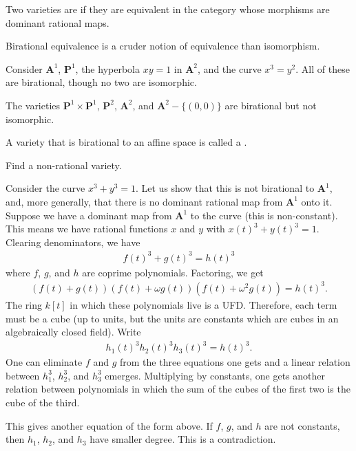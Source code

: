 \documentclass [11 pt, oneside, margin = 1 in] {article}
\begin{document}
\begin{definition}
	Two varieties are  if they are equivalent in the category whose morphisms are dominant rational maps.
\end{definition}

\begin{remark}
	Birational equivalence is a cruder notion of equivalence than isomorphism.
\end{remark}

\begin{example}[ ]\label{}\text{}
Consider $\mathbf{A}^1$, $\mathbf{P}^1 $, the hyperbola $xy=1$ in $\mathbf{A}^2$, and the curve $x^3=y^2$. All of these are birational, though no two are isomorphic.

The varieties $\mathbf{P}^1\times \mathbf{P}^1$, $\mathbf{P}^2$, $\mathbf{A}^2$, and $\mathbf{A}^2-\{(0,0)\}$ are birational but not isomorphic.
\end{example}

\begin{remark}
	A variety that is birational to an affine space is called a .
\end{remark}

\begin{problem}
	Find a non-rational variety.
\end{problem}

\begin{example}[ ]\label{}\text{}
Consider the curve $x^3+y^3=1$. Let us show that this is not birational to $\mathbf{A}^1$, and, more generally, that there is no dominant rational map from $\mathbf{A}^1$ onto it. Suppose we have a dominant map from $\mathbf{A}^1$ to the curve (this is non-constant). This means we have rational functions $x$ and $y$ with $x(t)^3+y (t)^3 =1$. Clearing denominators, we have 
\begin{align*}
	f(t)^3+g (t)^3=h (t)^3
\end{align*}
where $f$, $g$, and $h$ are coprime polynomials. Factoring, we get
\begin{align*}
	(f(t)+g (t)) (f(t)+\omega g (t)) (f(t) + \omega^2g (t)) = h(t)^3.
\end{align*}
The ring $k[t]$ in which these polynomials live is a UFD. Therefore, each term must be a cube (up to units, but the units are constants which are cubes in an algebraically closed field). Write
\begin{align*}
	h_1 (t)^3 h_2(t)^3  h_3(t)^3 = h (t)^3.
\end{align*}
One can eliminate $f$ and $g$ from the three equations one gets and a linear relation between $h_1^3$, $h_2^3$, and $h_3^3$ emerges. Multiplying by constants, one gets another relation between polynomials in which the sum of the cubes of the first two is the cube of the third. 

This gives another equation of the form above. If $f$, $g$, and $h$ are not constants, then $h_1$, $h_2$, and $h_3$ have smaller degree. This is a contradiction.
\end{example}
\end{document}
